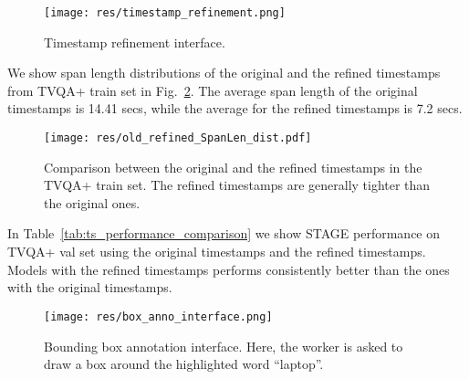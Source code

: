 \documentclass[11pt,a4paper]{article}
\begin{document}
\begin{figure}[!ht]
    \centering
  \texttt{[image: res/timestamp\_refinement.png]}
  \caption{Timestamp refinement interface.}
  \label{fig:timestamp_interface}
\end{figure} 

We show span length distributions of the original and the refined timestamps from TVQA+ train set in Fig.~\ref{fig:original_old_ts}. The average span length of the original timestamps is 14.41 secs, while the average for the refined timestamps is 7.2 secs. 

\begin{figure}[ht]
  \centering
  \texttt{[image: res/old\_refined\_SpanLen\_dist.pdf]}
  \caption{Comparison between the original and the refined timestamps in the TVQA+ train set. The refined timestamps are generally tighter than the original ones.}
  \label{fig:original_old_ts}
\end{figure} 


In Table~\ref{tab:ts_performance_comparison} we show STAGE performance on TVQA+ val set using the original timestamps and the refined timestamps. Models with the refined timestamps performs consistently better than the ones with the original timestamps. 


\begin{table}[ht]
\centering
\small
{}
\caption{STAGE performance comparison between the original timestamps and the refined timestamps on TVQA+ val set. \textit{Each row adds an extra component to the row above it.}}
\label{tab:ts_performance_comparison}
\end{table}


\begin{figure}[t]
  \centering
  \texttt{[image: res/box\_anno\_interface.png]}
  \caption{Bounding box annotation interface. Here, the worker is asked to draw a box around the highlighted word ``laptop''.}
  \label{fig:box_anno}
\end{figure} 
\end{document}
